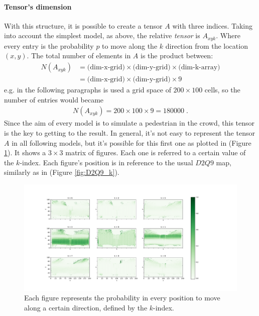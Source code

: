 \documentclass[class=article, crop=false]{standalone}
\begin{document}
\paragraph{Tensor's dimension}
With this structure, it is possible to create a tensor $A$ with three indices.
Taking into account the simplest model, as above, the relative \emph{tensor} is $A_{x y k}$.
Where every entry is the probability $p$ to move along the $k$ direction from the location $(x, y)$.
The total number of elements in $A$ is the product between: 
\begin{equation*}
\begin{split}
N(A_{xyk}) &= \mbox{(dim-x-grid)} \times \mbox{(dim-y-grid)} \times \mbox{(dim-k-array)} \\
& = \mbox{(dim-x-grid)} \times \mbox{(dim-y-grid)} \times 9
\end{split}
\end{equation*}
e.g. in the following paragraphs is used a grid space of $200\times100$ cells, so the number of entries would became 
\begin{equation*}
\begin{split}
N(A_{xyk})=200\times100\times9 = 180000 \; .
\end{split}
\end{equation*}
Since the aim of every model is to simulate a pedestrian in the crowd, this tensor is the key to getting to the result.
In general, it's not easy to represent the tensor $A$ in all following models, but it's possible for this first one as plotted in (Figure \ref{fig:TensorA_D2Q9}).
It shows a $3\times3$ matrix of figures.
Each one is referred to a certain value of the $k$-index.
Each figure's position is in reference to the usual $D2Q9$ map, similarly as in (Figure \ref{fig:D2Q9_k}).
\begin{figure}[h!]
\centering
\includegraphics[scale=0.35]{fig/figure_trainf10_all_trajectories_Dx200_Dy100_TensorA_D2Q9}
\captionsetup{width=.6\linewidth}
\caption{Each figure represents the probability in every position to move along a certain direction, defined by the $k$-index.}
\label{fig:TensorA_D2Q9}
\end{figure}
\end{document}
